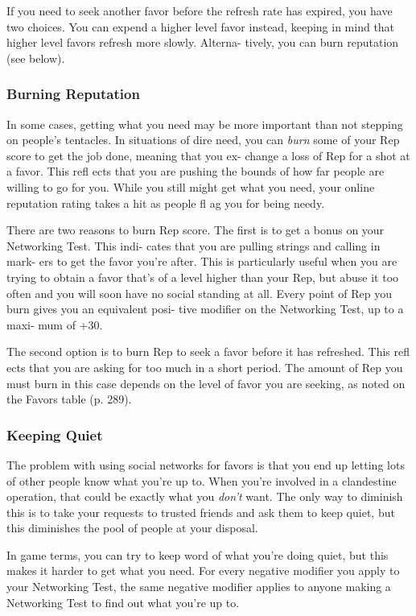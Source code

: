 If you need to seek another favor before the refresh 
rate has expired, you have two choices. You can 
expend a higher level favor instead, keeping in mind 
that higher level favors refresh more slowly. Alterna-
tively, you can burn reputation (see below).

\subsubsection{Burning Reputation}

In some cases, getting what you need may be more 
important than not stepping on people's tentacles. In 
situations of dire need, you can \textit{burn }some of your 
Rep score to get the job done, meaning that you ex-
change a loss of Rep for a shot at a favor. This refl ects 
that you are pushing the bounds of how far people are 
willing to go for you. While you still might get what 
you need, your online reputation rating takes a hit as 
people fl ag you for being needy.

There are two reasons to burn Rep score. The first 
is to get a bonus on your Networking Test. This indi-
cates that you are pulling strings and calling in mark-
ers to get the favor you're after. This is particularly 
useful when you are trying to obtain a favor that's of 
a level higher than your Rep, but abuse it too often 
and you will soon have no social standing at all. Every 
point of Rep you burn gives you an equivalent posi-
tive modifier on the Networking Test, up to a maxi-
mum of +30.

The second option is to burn Rep to seek a favor 
before it has refreshed. This refl ects that you are asking 
for too much in a short period. The amount of Rep 
you must burn in this case depends on the level of favor 
you are seeking, as noted on the Favors table (p. 289).

\subsubsection{Keeping Quiet}

The problem with using social networks for favors is 
that you end up letting lots of other people know what 
you're up to. When you're involved in a clandestine 
operation, that could be exactly what you \textit{don't} want. 
The only way to diminish this is to take your requests 
to trusted friends and ask them to keep quiet, but this 
diminishes the pool of people at your disposal.

In game terms, you can try to keep word of what 
you're doing quiet, but this makes it harder to get 
what you need. For every negative modifier you apply 
to your Networking Test, the same negative modifier 
applies to anyone making a Networking Test to find 
out what you're up to.

